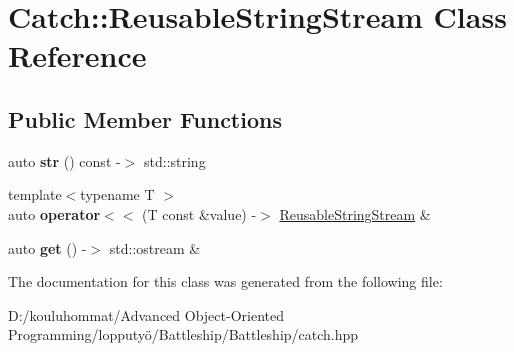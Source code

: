 \hypertarget{class_catch_1_1_reusable_string_stream}{}\section{Catch\+:\+:Reusable\+String\+Stream Class Reference}
\label{class_catch_1_1_reusable_string_stream}
\subsection*{Public Member Functions}
\begin{DoxyCompactItemize}
\item 
\mbox{\label{class_catch_1_1_reusable_string_stream_a0e9ecf260b2a5d35f4886ef0d51f6270}} 
auto {\bfseries str} () const -\/$>$ std\+::string
\item 
\mbox{\label{class_catch_1_1_reusable_string_stream_af95f72024c082db70e5e50782e28e4f6}} 
{\footnotesize template$<$typename T $>$ }\\auto {\bfseries operator$<$$<$} (T const \&value) -\/$>$ \mbox{\hyperlink{class_catch_1_1_reusable_string_stream}{Reusable\+String\+Stream}} \&
\item 
\mbox{\label{class_catch_1_1_reusable_string_stream_a6881808c60a080d4e24a0b81c94cbf67}} 
auto {\bfseries get} () -\/$>$ std\+::ostream \&
\end{DoxyCompactItemize}


The documentation for this class was generated from the following file\+:\begin{DoxyCompactItemize}
\item 
D\+:/kouluhommat/\+Advanced Object-\/\+Oriented Programming/lopputyö/\+Battleship/\+Battleship/catch.\+hpp\end{DoxyCompactItemize}
